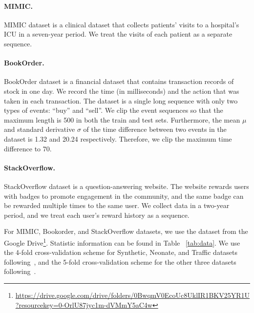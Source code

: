 \paragraph{MIMIC.} MIMIC dataset is a clinical dataset that collects patients' visits to a hospital's ICU in a seven-year period. We treat the visits of each patient as a separate sequence.

\paragraph{BookOrder.} BookOrder dataset is a financial dataset that contains transaction records of stock in one day. We record the time (in milliseconds) and the action that was taken in each transaction. The dataset is a single long sequence with only two types of events: “buy” and “sell”. We clip the event sequences so that the maximum length is 500 in both the train and test sets. Furthermore, the mean $\mu$ and standard derivative $\sigma$ of the time difference between two events in the dataset is 1.32 and 20.24 respectively. Therefore, we clip the maximum time difference to 70.

\paragraph{StackOverflow.} StackOverflow dataset is a question-answering website. The website rewards users with badges to promote engagement in the community, and the same badge can be rewarded multiple times to the same user. We collect data in a two-year period, and we treat each user’s reward history as a sequence.

For MIMIC, Bookorder, and StackOverflow datasets, we use the dataset from the Google Drive\footnote{\url{https://drive.google.com/drive/folders/0BwqmV0EcoUc8UklIR1BKV25YR1U?resourcekey=0-OrlU87jyc1m-dVMmY5aC4w}}. Statistic information can be found in Table ~\ref{tab:data}. We use the 4-fold cross-validation scheme for Synthetic, Neonate, and Traffic datasets following~\cite{fang2023learning}, and the 5-fold cross-validation scheme for the other three datasets following~\cite{mei2017neural, zuo2020transformer}.



